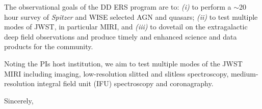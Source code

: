 \documentclass[11pt,a4paper]{letter} %
\begin{document}
\begin{letter}
The observational goals of the DD ERS program are to: {\it (i)} to perform a
$\sim$20 hour survey of {\it Spitzer} and WISE selected AGN and quasars; {\it (ii)} to
test multiple modes of JWST, in particular MIRI, and {\it (iii)} to dovetail
on the extragalactic deep field observations and produce timely and
enhanced science and data products for the community.

Noting the PIs host institution, we aim to test
multiple modes of the JWST MIRI including imaging, low-resolution
slitted and slitless spectroscopy, medium-resolution integral field
unit (IFU) spectroscopy and coronagraphy.

\closing{Sincerely,}


\end{letter}
\end{document}
